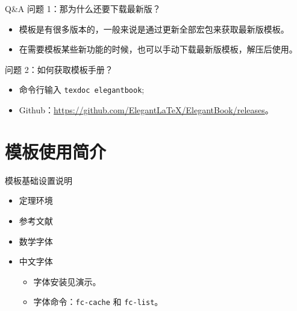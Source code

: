 \begin{frame}{Q\&A}
  \textcolor{iron}{问题 1：那为什么还要下载最新版？}
  \begin{itemize}
    \item 模板是有很多版本的，一般来说是通过更新全部宏包来获取最新版模板。
    \item 在需要模板某些新功能的时候，也可以手动下载最新版模板，解压后使用。
  \end{itemize}
  \vspace*{4ex}
  \textcolor{iron}{问题 2：如何获取模板手册？}
  \begin{itemize}
    \item 命令行输入 \lstinline{texdoc elegantbook};
    \item Github：\href{https://github.com/ElegantLaTeX/ElegantBook/releases}{https://github.com/ElegantLaTeX/ElegantBook/releases}。
  \end{itemize}
\end{frame}

\section{模板使用简介}

\begin{frame}{模板基础设置说明}
  \begin{itemize}
    \item 定理环境
    \item 参考文献
    \item 数学字体
    \item 中文字体
    \begin{itemize}
      \item 字体安装见演示。
      \item 字体命令：\lstinline{fc-cache} 和 \lstinline{fc-list}。
    \end{itemize}
  \end{itemize}
\end{frame}
